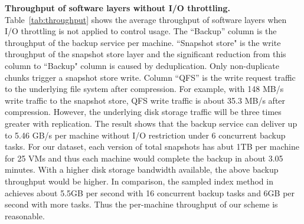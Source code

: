 {\bf Throughput of software layers without I/O throttling.}
Table~\ref{tab:throughput} shows the  average throughput of software layers
when I/O throttling is not applied to control usage. The
``Backup'' column is the throughput  of the backup service  per machine.
``Snapshot store" is the  write throughput of the snapshot store layer and the significant reduction from this
column to  ``Backup" column is caused by deduplication.
Only non-duplicate chunks trigger a snapshot store write.
Column ``QFS'' is the write request traffic to the underlying file system after compression.
For example, with 148 MB/s write traffic to the snapshot store, QFS write traffic is about 35.3 MB/s
after compression.  However, the underlying disk storage traffic will be three times greater with replication.
The result shows that the backup service can deliver up to 5.46 GB/s 
per machine without I/O restriction
under 6 concurrent backup tasks. 
For our dataset, each version of total snapshots has abut 1TB per machine for 25 VMs and  thus  each machine
would complete the backup in about 3.05 minutes.
With a higher disk storage bandwidth available, the above backup
throughput would be higher. 
In comparison, the sampled index method in~\cite{Guo2011} achieves about 5.5GB per second
with 16 concurrent backup tasks and 6GB per second with
more tasks.  Thus the per-machine throughput of our scheme is reasonable.
 



